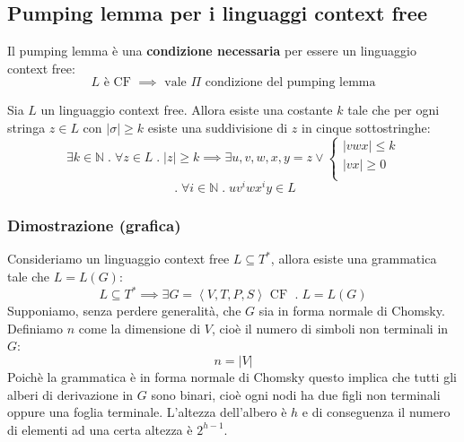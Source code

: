 \documentclass[a4paper]{article}
\begin{document}
\subsection{Pumping lemma per i linguaggi context free}
Il pumping lemma è una \textbf{condizione necessaria} per essere un linguaggio context free:
\[
  L \text{ è CF } \implies \text{ vale } \Pi \text{ condizione del pumping lemma}
\] 
\begin{theorem}
  Sia \( L \) un linguaggio context free. Allora esiste una costante
  \( k \) tale che per ogni stringa \( z \in L \) con
  \( \left| \sigma \right| \ge k \) esiste una suddivisione di \( z \)
  in cinque sottostringhe:
  \[
    \exists k \in \mathbb{N} \;.\; \forall z \in L \;.\; \left| z \right| \ge k \implies
    \exists u, v, w, x, y = z \vee
    \begin{cases}
      \left| vwx \right| \le  k \\
      \left| vx \right| \ge 0 \\
    \end{cases}
  \] 
  \[
    \;.\; \forall i \in \mathbb{N} \;.\; u v^i w x^i y \in L
  \] 
  \label{04-11-D1}
\end{theorem}

\subsubsection{Dimostrazione (grafica)}
Consideriamo un linguaggio context free \( L \subseteq T^* \), allora esiste
una grammatica tale che \( L = L(G) \):
\[
  L \subseteq T^* \implies \exists G = \left< V, T, P, S \right> \text{ CF } \;.\; L = L(G)
\] 
Supponiamo, senza perdere generalità, che \( G \) sia in forma normale di Chomsky.
Definiamo \( n \) come la dimensione di \( V \), cioè il numero di simboli non terminali in
\( G \):
\[
  n = \left| V \right|
\] 
Poichè la grammatica è in forma normale di Chomsky questo implica che tutti gli alberi
di derivazione in \( G \) sono binari, cioè ogni nodi ha due figli non terminali oppure una foglia
terminale.
\label{04-11-D2}
L'altezza dell'albero è \( h \) e di conseguenza il numero di elementi ad una certa
altezza è \( 2^{h-1} \).
\end{document}
